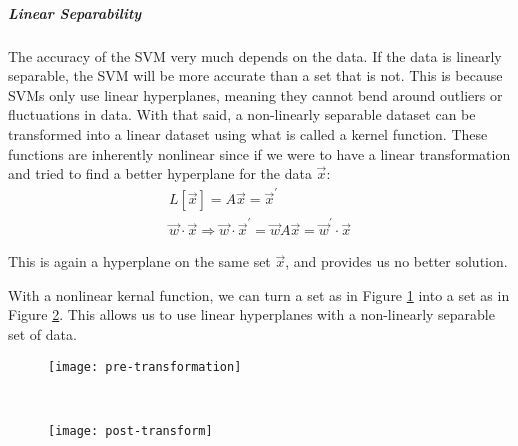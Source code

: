 \subparagraph{Linear Separability}
The accuracy of the SVM very much depends on the data. If the data is linearly separable, the SVM will be more accurate than a set that is not. This is because SVMs only use linear hyperplanes, meaning they cannot bend around outliers or fluctuations in data. With that said, a non-linearly separable dataset can be transformed into a linear dataset using what is called a kernel function. These functions are inherently nonlinear since if we were to have a linear transformation and tried to find a better hyperplane for the data $\vec{x}$:
\begin{equation}
\begin{gathered}
	L[\vec{x}] = A\vec{x} = \vec{x}^{'} \\
	\vec{w}\cdot \vec{x} \Rightarrow \vec{w} \cdot \vec{x}^{'} = \vec{w}A\vec{x} = \vec{w}^{'}\cdot\vec{x} 
\end{gathered}
\end{equation}

This is again a hyperplane on the same set $\vec{x}$, and provides us no better solution.

With a nonlinear kernal function, we can turn a set as in Figure \ref{fig:pre-trans} into a set as in Figure \ref{fig:post-trans}. This allows us to use linear hyperplanes with a non-linearly separable set of data.

\begin{figure*}[t]
	\centering
	\begin{subfigure}[t]{0.5\textwidth}
		\texttt{[image: pre-transformation]}
		\caption{}
		\centering
		\label{fig:pre-trans}
	\end{subfigure}%
~
	\begin{subfigure}[t]{0.5\textwidth}
		\texttt{[image: post-transform]}
		\caption{}
		\centering
		\label{fig:post-trans}
	\end{subfigure}%

	\caption{The data before (\ref{fig:pre-trans}) and after (\ref{fig:post-trans}) a nonlinear kernal function was applied. It is now linearly separable and thus an SVM is a viable classifying tool. }	
	\label{fig:trans}
\end{figure*}
